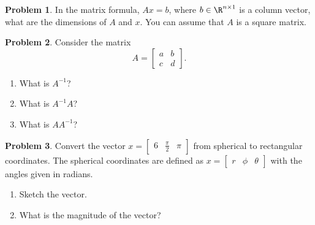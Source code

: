 \documentclass[10pt]{article}
\theoremstyle{definition}
\newtheorem{prob}{Problem}[section]
\newenvironment{subprob}%
{\renewcommand{\theenumi}{\alph{enumi}}\renewcommand{\labelenumi}{(\theenumi)}\begin{enumerate}}%
{\end{enumerate}}%
\begin{document}
\begin{prob}
    In the matrix formula, \( A x = b \), where \( b \in \R^{n\times1} \) is a column vector, what are the dimensions of \( A \) and \(x \).
    You can assume that \( A \) is a square matrix.
\end{prob}

\begin{prob}
    Consider the matrix 
    \begin{equation}
    A = \begin{bmatrix} a & b \\ c & d \end{bmatrix}.
    \end{equation}
    \begin{subprob}
    \item What is \( A^{-1} \)?
    \item What is \( A^{-1} A \)?
    \item What is \( A A^{-1} \)?
    \end{subprob}
\end{prob}

\begin{prob}
Convert the vector \( x = \begin{bmatrix} 6 & \frac{\pi}{2} & \pi \end{bmatrix}\) from spherical to rectangular coordinates.
The spherical coordinates are defined as \( x = \begin{bmatrix} r & \phi & \theta \end{bmatrix}\) with the angles given in radians.
    \begin{figure}[h]
        \centering

    \end{figure}
    \begin{subprob}
    \item Sketch the vector.
    \item What is the magnitude of the vector?
    \end{subprob}
\end{prob}
\end{document}

